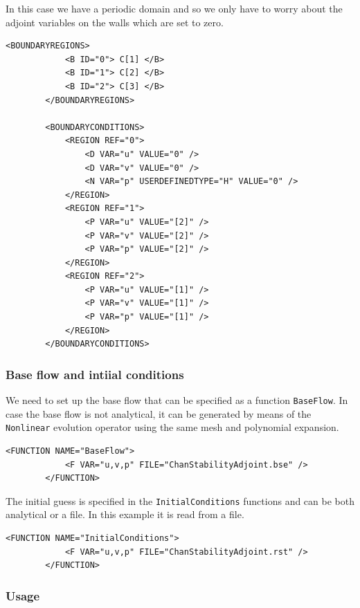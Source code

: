     In this case we have a periodic domain and so we only have to
    worry about the adjoint variables on the walls which are set to
    zero.
    
    \begin{lstlisting}[style=XMLStyle]
 <BOUNDARYREGIONS>
            <B ID="0"> C[1] </B>
            <B ID="1"> C[2] </B>
            <B ID="2"> C[3] </B>
        </BOUNDARYREGIONS>

        <BOUNDARYCONDITIONS>
            <REGION REF="0">
                <D VAR="u" VALUE="0" />
                <D VAR="v" VALUE="0" />
                <N VAR="p" USERDEFINEDTYPE="H" VALUE="0" />
            </REGION>
            <REGION REF="1">
                <P VAR="u" VALUE="[2]" />
                <P VAR="v" VALUE="[2]" />
                <P VAR="p" VALUE="[2]" />
            </REGION>
            <REGION REF="2">
                <P VAR="u" VALUE="[1]" />
                <P VAR="v" VALUE="[1]" />
                <P VAR="p" VALUE="[1]" />
            </REGION>
        </BOUNDARYCONDITIONS>
  \end{lstlisting}


\subsubsection*{Base flow and intiial conditions}

We need to set up the base flow that can be specified as a function
\texttt{BaseFlow}. In case the base flow is not analytical, it can be
generated by means of the \texttt{Nonlinear} evolution operator using
the same mesh and polynomial expansion.

    \begin{lstlisting}[style=XMLStyle]
        <FUNCTION NAME="BaseFlow">
            <F VAR="u,v,p" FILE="ChanStabilityAdjoint.bse" />
        </FUNCTION>
  \end{lstlisting}

  The initial guess is specified in the \texttt{InitialConditions}
  functions and can be both analytical or a file. In this example it
  is read from a file.

      \begin{lstlisting}[style=XMLStyle]
        <FUNCTION NAME="InitialConditions">
            <F VAR="u,v,p" FILE="ChanStabilityAdjoint.rst" />
        </FUNCTION>
          \end{lstlisting}

\subsubsection*{Usage}

